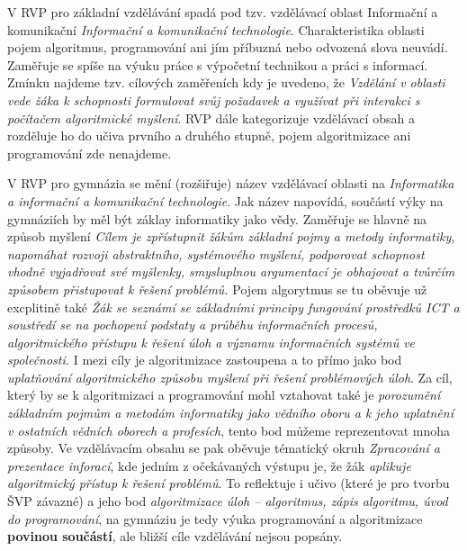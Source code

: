 \documentclass[FP,DP]{tulthesis}
\begin{document}
{V RVP pro základní vzdělávání \citep{rvpzv} spadá pod tzv. vzdělávací oblast Informační a komunikační \textit{Informační a komunikační technologie}. Charakteristika oblasti pojem algoritmus, programování ani jím příbuzná nebo odvozená slova neuvádí. Zaměřuje se spíše na výuku práce s výpočetní technikou a práci s informací. Zmínku najdeme tzv. cílových zaměřeních kdy je uvedeno, že \textit{Vzdělání v oblasti vede žáka k schopnosti formulovat svůj požadavek a využívat při interakci s počítačem algoritmické myšlení}. RVP dále kategorizuje vzdělávací obsah a rozděluje ho do učiva prvního a druhého stupně, pojem algoritmizace ani programování zde nenajdeme. 

V RVP pro gymnázia se mění (rozšiřuje) název vzdělávací oblasti na \textit {Informatika a informační a komunikační technologie}. Jak název napovídá, součástí výky na gymnáziích by měl být záklay informatiky jako vědy. Zaměřuje se hlavně na způsob myšlení \textit {Cílem je zpřístupnit žákům základní pojmy a metody informatiky, napomáhat rozvoji abstraktního, systémového myšlení, podporovat schopnost vhodně vyjadřovat své myšlenky, smysluplnou argumentací je obhajovat a tvůrčím způsobem přistupovat k řešení problémů.} Pojem algorytmus se tu oběvuje už excplitině také \textit {Žák se seznámí se základními principy fungování prostředků ICT a soustředí se na pochopení podstaty a průběhu informačních procesů, algoritmického přístupu k řešení úloh a významu informačních systémů ve společnosti.} I mezi cíly je algoritmizace zastoupena a to přímo jako bod \textit {uplatňování algoritmického způsobu myšlení při řešení problémových úloh}. Za cíl, který by se k algoritmizaci a programování mohl vztahovat také je \textit {porozumění základním pojmům a metodám informatiky jako vědního oboru a k jeho uplatnění v ostatních vědních oborech a profesích}, tento bod můžeme reprezentovat mnoha způsoby. Ve vzdělávacím obsahu se pak oběvuje tématický okruh \textit {Zpracování  a prezentace inforací}, kde jedním z očekávaných výstupu je, že žák \textit {aplikuje algoritmický přístup k řešení problémů}. To reflektuje i učivo (které je pro tvorbu ŠVP závazné) a jeho bod \textit {algoritmizace úloh – algoritmus, zápis algoritmu, úvod do programování}, na gymnáziu je tedy výuka programování a algoritmizace \textbf{povinou součástí}, ale bližší cíle vzdělávání nejsou popsány.

}
\end{document}
